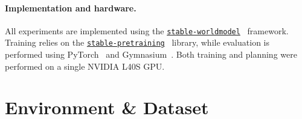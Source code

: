 \paragraph{Implementation and hardware.}
All experiments are implemented using the \href{https://github.com/rbalestr-lab/stable-worldmodel}{\texttt{stable-worldmodel}}~\cite{maes_lelidec2026swm} framework. Training relies on the \href{https://github.com/rbalestr-lab/stable-pretraining}{\texttt{stable-pretraining}}~\cite{balestriero2025spt} library, while evaluation is performed using PyTorch~\cite{paszke2019torch} and Gymnasium~\cite{towers2024gymnasium}. Both training and planning were performed on a single NVIDIA L40S GPU.

\section{Environment \& Dataset} \label{appendix:envs}

